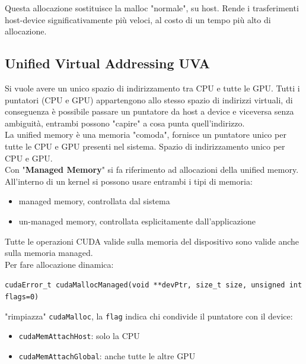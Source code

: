 Questa allocazione sostituisce la malloc "normale", su host. Rende i trasferimenti host-device significativamente più veloci, al costo di un tempo più alto di allocazione.\\

\newpage

\subsection{Unified Virtual Addressing UVA}

Si vuole avere un unico spazio di indirizzamento tra CPU e tutte le GPU. Tutti i puntatori (CPU e GPU) appartengono allo stesso spazio di indirizzi virtuali, di conseguenza è possibile passare un puntatore da host a device e viceversa senza ambiguità, entrambi possono "capire" a cosa punta quell'indirizzo.\\



La unified memory è una memoria "comoda", fornisce un puntatore unico per tutte le CPU e GPU presenti nel sistema. Spazio di indirizzamento unico per CPU e GPU.\\

Con "\textbf{Managed Memory}" si fa riferimento ad allocazioni della unified memory. All'interno di un kernel si possono usare entrambi i tipi di memoria: 
\begin{itemize}
	\item managed memory, controllata dal sistema
	\item un-managed memory, controllata esplicitamente dall'applicazione
\end{itemize}
Tutte le operazioni CUDA valide sulla memoria del dispositivo sono valide anche sulla memoria managed.\\

Per fare allocazione dinamica:
\begin{center}
	\texttt{cudaError\_t cudaMallocManaged(void **devPtr, size\_t size, unsigned int flags=0)}
\end{center}
"rimpiazza" \texttt{cudaMalloc}, la \texttt{flag} indica chi condivide il puntatore con il device:
\begin{itemize}
	\item \texttt{cudaMemAttachHost}: solo la CPU
	\item \texttt{cudaMemAttachGlobal}: anche tutte le altre GPU
\end{itemize}

